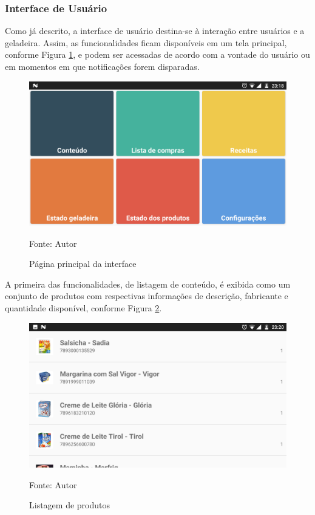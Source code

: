 
\subsubsection{Interface de Usuário}

Como já descrito, a interface de usuário destina-se à interação entre usuários e a geladeira. Assim, as funcionalidades ficam disponíveis em um tela principal, conforme Figura \ref{fig:cap3_app_mainpage}, e podem ser acessadas de acordo com a vontade do usuário ou em momentos em que notificações forem disparadas.

\begin{figure}[htb]
    \caption{Página principal da interface}
    \label{fig:cap3_app_mainpage}
    \includegraphics[width=\textwidth]{figuras/cap4_app_mainpage.png}
    
    \footnotesize{Fonte: Autor}
\end{figure}

A primeira das funcionalidades, de listagem de conteúdo, é exibida como um conjunto de produtos com respectivas informações de descrição, fabricante e quantidade disponível, conforme Figura \ref{fig:cap4_listagem_de_produtos}.

\begin{figure}[htb]
    \caption{Listagem de produtos}
    \label{fig:cap4_listagem_de_produtos}
    \includegraphics[width=\textwidth]{figuras/cap4_listagem_de_produtos.png}
    
   \footnotesize{Fonte: Autor}
\end{figure}

